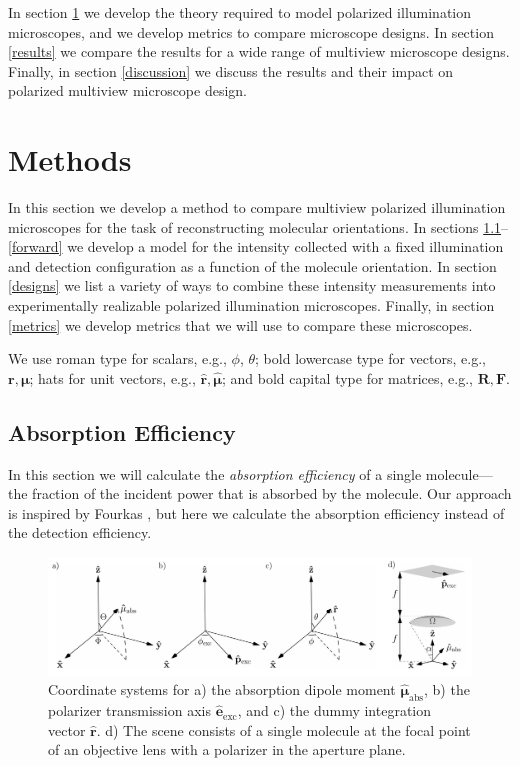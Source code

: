 \documentclass[10pt]{article}
\providecommand{\mb}[1]{\mathbf{#1}}
\providecommand{\mh}[1]{\mathbf{\hat{#1}}}
\providecommand{\bs}[1]{\boldsymbol{#1}}
\begin{document}
In section \ref{methods} we develop the theory required to model polarized
illumination microscopes, and we develop metrics to compare microscope
designs. In section \ref{results} we compare the results for a wide range of
multiview microscope designs. Finally, in section \ref{discussion} we discuss
the results and their impact on polarized multiview microscope design.

\section{Methods}\label{methods}
In this section we develop a method to compare multiview polarized illumination
microscopes for the task of reconstructing molecular orientations. In sections
\ref{excitation}--\ref{forward} we develop a model for the intensity collected
with a fixed illumination and detection configuration as a function of the
molecule orientation. In section \ref{designs} we list a variety of ways to
combine these intensity measurements into experimentally realizable polarized
illumination microscopes. Finally, in section \ref{metrics} we develop metrics
that we will use to compare these microscopes.

We use roman type for scalars, e.g., $\phi$, $\theta$; bold lowercase type for
vectors, e.g., $\mb{r}, \bs{\mu}$; hats for unit vectors, e.g.,
$\mh{r}, \hat{\bs{\mu}}$; and bold capital type for matrices, e.g.,
$\mb{R}, \mb{F}$.

\subsection{Absorption Efficiency}\label{excitation}
In this section we will calculate the \emph{absorption efficiency} of a single
molecule---the fraction of the incident power that is absorbed by the
molecule. Our approach is inspired by Fourkas \cite{fourkas2001}, but here we
calculate the absorption efficiency instead of the detection efficiency.

\begin{figure}[H]
\centering\includegraphics[width=\textwidth]{frames}
\caption{Coordinate systems for a) the absorption dipole moment
  $\hat{\bs{\mu}}_{\text{abs}}$, b) the polarizer transmission axis
  $\hat{\mb{e}}_{\text{exc}}$, and c) the dummy integration vector
  $\hat{\mb{r}}$. d) The scene consists of a single molecule at the focal point
  of an objective lens with a polarizer in the aperture plane.}
\label{fig:coordinates}
\end{figure}
\end{document}
